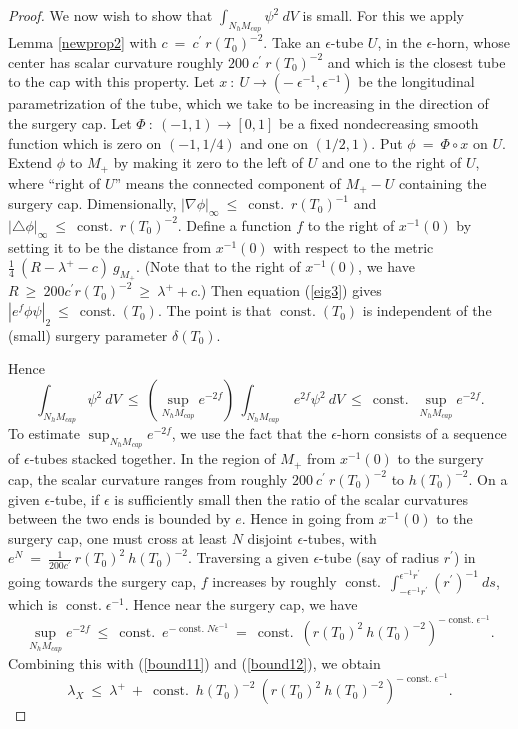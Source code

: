 \documentclass[12pt]{amsart}
\newcommand{\const}{\operatorname{const.}}
\numberwithin{equation}{section}
\theoremstyle{plain}
\theoremstyle{definition}
\theoremstyle{remark}
\begin{document}
\begin{proof}
We now wish to show that $\int_{N_h M_{cap}} \psi^2 \: dV$ is small.
For this we apply Lemma \ref{newprop2} with
$c \: = \: c^\prime \: r(T_0)^{-2}$. Take an $\epsilon$-tube $U$,
in the $\epsilon$-horn,
whose center has scalar curvature roughly $200 \: c^\prime \: r(T_0)^{-2}$
and which is the closest tube to the cap with this property.
Let $x \: : \: U \rightarrow
(- \: \epsilon^{-1}, \epsilon^{-1})$ 
be the longitudinal parametrization of the tube,
which we take to be increasing in the direction of the surgery cap. 
Let $\Phi \: : \: (-1, 1) \rightarrow [0,1]$
be a fixed nondecreasing smooth function which is zero on $(-1, 1/4)$ and one on
$(1/2, 1)$. Put $\phi \: = \: \Phi \circ x$ on $U$.
Extend $\phi$ to $M_+$ by making it zero to the left of $U$ and one to the right of $U$,
where ``right of $U$'' means the connected component of $M_+ - U$ containing the
surgery cap.
Dimensionally, $|\nabla \phi|_\infty \: \le \: \const \: 
r(T_0)^{-1}$ and $|\triangle \phi|_\infty \: \le \: \const \:  r(T_0)^{-2}$.
Define a function $f$ to the right of $x^{-1}(0)$ by setting it to be the distance from $x^{-1}(0)$
with respect to the metric $\frac14 \: (R - \lambda^+ - c) \: g_{M_+}$. 
(Note that to the right of $x^{-1}(0)$, we have
$R \: \ge \: 200 c^\prime r(T_0)^{-2} \: \ge \: \lambda^+ + c$.) 
Then
equation (\ref{eig3}) gives
$|e^f \phi \psi|_2 \: \le \: \const (T_0)$. The point is that $\const (T_0)$ is independent
of the (small) surgery parameter $\delta(T_0)$. 

Hence
\begin{equation} \label{bound12}
\int_{N_h M_{cap}} \psi^2 \: dV \: \le \:
\left( \sup_{N_h M_{cap}} e^{-2f} \right) \: 
\int_{N_h M_{cap}} \: e^{2f} \psi^2 \: dV \: \le \:
\const \: \sup_{N_h M_{cap}} e^{-2f}.
\end{equation}
To estimate $\sup_{N_h M_{cap}} e^{-2f}$, we use the fact that
the $\epsilon$-horn consists of a
sequence of $\epsilon$-tubes stacked together.  In the 
region of $M_+$ from $x^{-1}(0)$ to the surgery cap, the scalar curvature
ranges from roughly $200 \: c^\prime \: r(T_0)^{-2}$
to $h(T_0)^{-2}$.
On a given
$\epsilon$-tube, if $\epsilon$ is sufficiently small then
the ratio of the scalar curvatures between the
two ends is bounded by $e$. Hence in going 
from $x^{-1}(0)$ to the surgery cap,
one must cross at least $N$ disjoint $\epsilon$-tubes,
with $e^N \: = \: \frac{1}{200 c^\prime} \: r(T_0)^2 \: h(T_0)^{-2}$. 
Traversing a given $\epsilon$-tube (say of
radius $r^\prime$) in going towards the surgery cap, $f$ increases by
roughly $\const \: \int_{- \epsilon^{-1}r^\prime}^{\epsilon^{-1}r^\prime}
(r^\prime)^{-1} \: ds$, which is $\const \epsilon^{-1}$. Hence near
the surgery cap, we have
\begin{equation}
\sup_{N_h M_{cap}} e^{-2f} \: \le \: \const \: e^{-\const N \epsilon^{-1}}
\: = \: \const \: (r(T_0)^2 \: h(T_0)^{-2})^{-\const \epsilon^{-1}}.
\end{equation}
Combining this with (\ref{bound11}) and (\ref{bound12}), we obtain
\begin{equation}
\lambda_X \: \le \: \lambda^+ \: + \: \const \: h(T_0)^{-2} \: 
(r(T_0)^2 \: h(T_0)^{-2})^{- \const \epsilon^{-1}}.  
\end{equation}



\end{proof}
\end{document}
